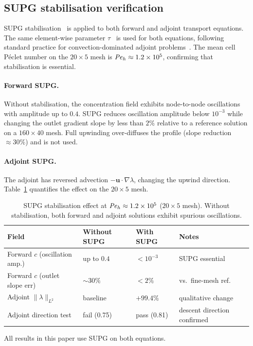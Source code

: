 \subsection{SUPG stabilisation verification}
\label{sec:supg_val}
SUPG stabilisation~\cite{donea2003,brooks1982} is applied to both
forward and adjoint transport equations.
The same element-wise parameter $\tau$~\cite{donea2003} is used
for both equations, following standard practice for
convection-dominated adjoint
problems~\cite{collis2002,nadarajah2000}.
The mean cell P\'{e}clet number on the $20\times5$ mesh
is $\mathit{Pe}_h\approx1.2\times10^5$, confirming that stabilisation
is essential.

\paragraph{Forward SUPG.}
Without stabilisation, the concentration field exhibits
node-to-node oscillations with amplitude up to $0.4$.
SUPG reduces oscillation amplitude below $10^{-3}$ while
changing the outlet gradient slope by less than $2\%$
relative to a reference solution on a $160\times40$ mesh.
Full upwinding over-diffuses the profile (slope reduction $\approx30\%$)
and is not used.

\paragraph{Adjoint SUPG.}
The adjoint has reversed advection $-\mathbf{u}\cdot\nabla\lambda$,
changing the upwind direction.
Table~\ref{tab:supg} quantifies the effect on the $20\times5$ mesh.

\begin{table}[h]
\centering\small
\caption{SUPG stabilisation effect at $\mathit{Pe}_h\approx1.2\times10^5$
         ($20\times5$ mesh). Without stabilisation, both forward
         and adjoint solutions exhibit spurious oscillations.}
\label{tab:supg}
\begin{tabular}{@{}p{3.5cm}p{2.8cm}p{2.8cm}p{3cm}@{}}
\toprule
\textbf{Field} & \textbf{Without SUPG} & \textbf{With SUPG} & \textbf{Notes} \\
\midrule
Forward $c$ (oscillation amp.) & up to $0.4$  & $<10^{-3}$   & SUPG essential \\
Forward $c$ (outlet slope err) & $\sim30\%$ & $<2\%$      & vs.\ fine-mesh ref.\\
Adjoint $\|\lambda\|_{L^2}$  & baseline    & $+99.4\%$   & qualitative change \\
Adjoint direction test         & fail (0.75)  & pass (0.81)  & descent direction confirmed \\
\bottomrule
\end{tabular}
\end{table}
All results in this paper use SUPG on both equations.

